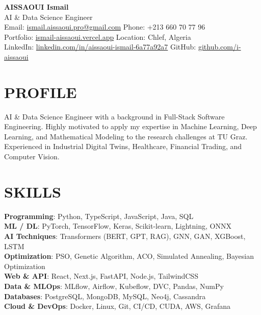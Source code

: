 \documentclass[a4paper,12pt]{article}
\begin{document}
\begin{center}
    {\Huge\bfseries\color{titleblue} AISSAOUI Ismail}\\[4pt]
    {\Large AI \& Data Science Engineer}\\[6pt]

    {\normalsize
    Email: \href{mailto:ismail.aissaoui.pro@gmail.com}{ismail.aissaoui.pro@gmail.com} \quad
    Phone: +213 660 70 77 96 \\
    Portfolio: \href{https://ismail-aissaoui.vercel.app}{ismail-aissaoui.vercel.app} \quad
    Location: Chlef, Algeria \\
    LinkedIn: \href{https://linkedin.com/in/aissaoui-ismail-6a77a92a7}{linkedin.com/in/aissaoui-ismail-6a77a92a7} \quad
    GitHub: \href{https://github.com/i-aissaoui}{github.com/i-aissaoui}
    }
\end{center}

\section{PROFILE}
AI \& Data Science Engineer with a background in Full-Stack Software Engineering. Highly motivated to apply my expertise in Machine Learning, Deep Learning, and Mathematical Modeling to the research challenges at TU Graz. Experienced in Industrial Digital Twins, Healthcare, Financial Trading, and Computer Vision.

\section{SKILLS}
\textbf{Programming}: Python, TypeScript, JavaScript, Java, SQL \\
\textbf{ML / DL}: PyTorch, TensorFlow, Keras, Scikit-learn, Lightning, ONNX \\
\textbf{AI Techniques}: Transformers (BERT, GPT, RAG), GNN, GAN, XGBoost, LSTM \\
\textbf{Optimization}: PSO, Genetic Algorithm, ACO, Simulated Annealing, Bayesian Optimization \\
\textbf{Web \& API}: React, Next.js, FastAPI, Node.js, TailwindCSS \\
\textbf{Data \& MLOps}: MLflow, Airflow, Kubeflow, DVC, Pandas, NumPy \\
\textbf{Databases}: PostgreSQL, MongoDB, MySQL, Neo4j, Cassandra \\
\textbf{Cloud \& DevOps}: Docker, Linux, Git, CI/CD, CUDA, AWS, Grafana 
\end{document}
